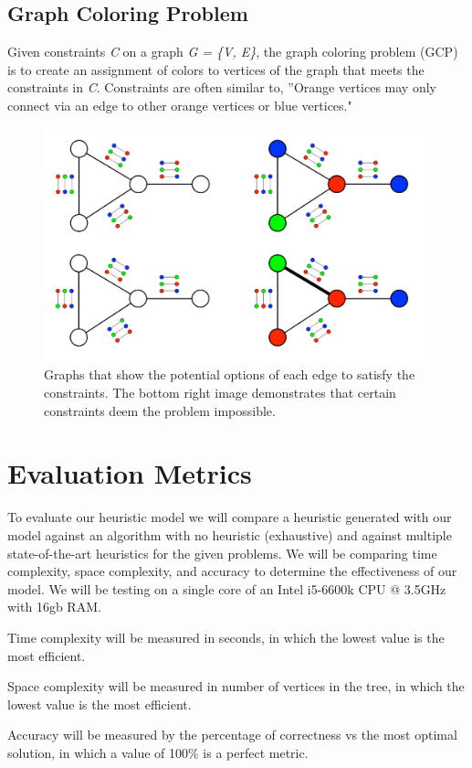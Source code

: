 \documentclass[10pt,twoside]{IEEEtran}
\begin{document}
\subsection{Graph Coloring Problem}
Given constraints \emph{C} on a graph \emph{G = \{V, E\}}, the graph coloring problem (GCP) is to create an assignment of colors to vertices of the graph that meets the constraints in \emph{C}. Constraints are often similar to, ''Orange vertices may only connect via an edge to other orange vertices or blue vertices."

\begin{figure}[h]
	\centering
	\includegraphics[width=0.7\linewidth]{diagrams/GCP.jpg}
	\caption{Graphs that show the potential options of each edge to satisfy the constraints. The bottom right image demonstrates that certain constraints deem the problem impossible.}
	\label{GCP Fig}
\end{figure}

\section{Evaluation Metrics}
To evaluate our heuristic model we will compare a heuristic generated with our model against an algorithm with no heuristic (exhaustive) and against multiple state-of-the-art heuristics for the given problems. We will be comparing time complexity, space complexity, and accuracy to determine the effectiveness of our model. We will be testing on a single core of an Intel i5-6600k CPU @ 3.5GHz with 16gb RAM.

Time complexity will be measured in seconds, in which the lowest value is the most efficient.

Space complexity will be measured in number of vertices in the tree, in which the lowest value is the most efficient.

Accuracy will be measured by the percentage of correctness vs the most optimal solution, in which a value of 100\% is a perfect metric.
\end{document}
